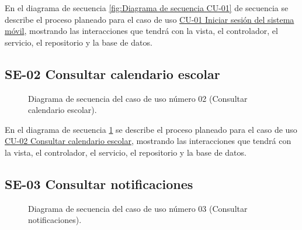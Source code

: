 En el diagrama de secuencia \ref{fig:Diagrama de secuencia CU-01} de secuencia se describe el proceso planeado para el caso de uso \hyperlink{CU-01}{CU-01 Iniciar sesión del sistema móvil}, mostrando las interacciones que tendrá con la vista, el controlador, el servicio, el repositorio y la base de datos.

\newpage

\subsection{SE-02 Consultar calendario escolar}

\begin{figure}[htbp!]
	\begin{center}
		\caption{Diagrama de secuencia del caso de uso número 02 (Consultar calendario escolar).}
		\label{fig:Diagrama de secuencia CU-02}
	\end{center}
\end{figure}

En el diagrama de secuencia \ref{fig:Diagrama de secuencia CU-02} se describe el proceso planeado para el caso de uso \hyperlink{CU-02}{CU-02 Consultar calendario escolar}, mostrando las interacciones que tendrá con la vista, el controlador, el servicio, el repositorio y la base de datos.

\newpage

\subsection{SE-03 Consultar notificaciones}

\begin{figure}[htbp!]
	\begin{center}
		\caption{Diagrama de secuencia del caso de uso número 03 (Consultar notificaciones).}
		\label{fig:Diagrama se secuencia CU-03}
	\end{center}
\end{figure}

